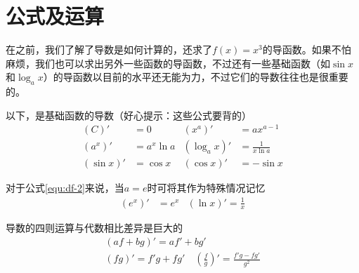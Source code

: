 \section{公式及运算}
在之前，我们了解了导数是如何计算的，还求了$f(x)=x^3$的导函数。如果不怕麻烦，我们也可以求出另外一些函数的导函数，不过还有一些基础函数（如$\sin x$和$\log_ax$）的导函数以目前的水平还无能为力，不过它们的导数往往也是很重要的。

以下，是基础函数的导数（好心提示：这些公式要背的）
\begin{align}
    (C)'&=0 & (x^a)'&=ax^{a-1} \label{equ:df-1} \\
    (a^x)'&=a^x\ln a & (\log_ax)'&=\frac{1}{x\ln a} \label{equ:df-2} \\
    (\sin x)'&=\cos x & (\cos x)'&=-\sin x \label{equ:df-3}
\end{align}

对于公式\eqref{equ:df-2}来说，当$a=e$时可将其作为特殊情况记忆
\begin{align*}
    (e^x)'&=e^x & (\ln x)'=\frac{1}{x}
\end{align*}

导数的四则运算与代数相比差异是巨大的
\begin{gather}
    (af+bg)'=af'+bg' \label{equ:drule-1} \\
    (fg)'=f'g+fg' \quad (\frac{f}{g})'=\frac{f'g-fg'}{g^2} \label{equ:drule-2}
\end{gather}

